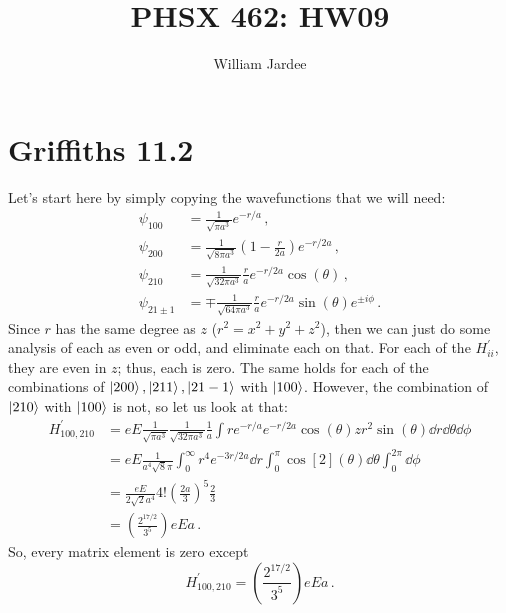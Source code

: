 \documentclass[11pt]{article}
\begin{document}
\title{PHSX 462: HW09}
\author{William Jardee}
\maketitle


\section*{Griffiths 11.2}
Let's start here by simply copying the wavefunctions that we will need:
\begin{align*}
\psi_{100} & = \frac{1}{\sqrt{\pi a^3}}e^{-r/a} \, ,\\
\psi_{200} & = \frac{1}{\sqrt{8\pi a^3}}\left(1 - \frac{r}{2a}\right)e^{-r/2a} \, ,\\
\psi_{210} & = \frac{1}{\sqrt{32\pi a^3}}\frac{r}{a} e^{-r/2a}\cos(\theta) \, ,\\
\psi_{21\pm 1} & = \mp \frac{1}{\sqrt{64 \pi a^3}}\frac{r}{a} e^{-r/2a}\sin(\theta)e^{\pm i\phi} \, .
\end{align*}
Since $r$ has the same degree as $z$ ($r^2 = x^2 + y^2 + z^2$), then we can just do some analysis of each as even or odd, and eliminate each on that. For each of the $H^\prime_{ii}$, they are even in $z$; thus, each is zero. The same holds for each of the combinations of $\ket{200}, \ket{211}, \ket{21-1}$ with $\ket{100}$. However, the combination of $\ket{210}$ with $\ket{100}$ is not, so let us look at that:
\begin{align*}
H^\prime_{100, 210} & = eE\frac{1}{\sqrt{\pi a^3}}\frac{1}{\sqrt{32 \pi a^3}}\frac{1}{a}\int re^{-r/a} e^{-r/2a}\cos(\theta) z r^2 \sin(\theta) \dd{r}\dd{\theta}\dd{\phi}\\
& = eE \frac{1}{a^4\sqrt{8}\pi}\int^\infty_0 r^4 e^{-3r/2a} \dd{r} \int_0^\pi \cos[2](\theta) \dd{\theta} \int^{2\pi}_0 \dd{\phi}\\
& = \frac{eE}{2\sqrt{2}a^4}4!\left(\frac{2a}{3}\right)^5\frac{2}{3}\\
& = \left(\frac{2^{17/2}}{3^5}\right)eEa \, .
\end{align*}
So, every matrix element is zero except 
\[\boxed{H^\prime_{100, 210} = \left(\frac{2^{17/2}}{3^5}\right)eEa} \, .\]

\newpage
\end{document}
